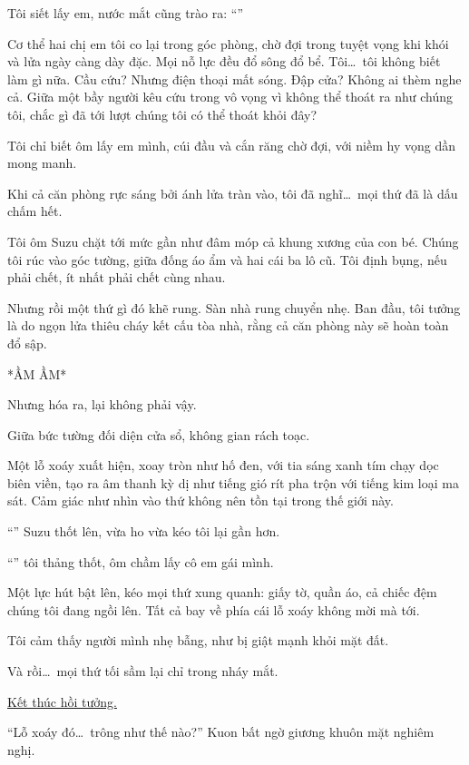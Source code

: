 \documentclass[../main.tex]{subfiles}
\begin{document}
Tôi siết lấy em, nước mắt cũng trào ra: ``''

Cơ thể hai chị em tôi co lại trong góc phòng, chờ đợi trong tuyệt vọng khi khói và lửa ngày càng dày đặc. Mọi nỗ lực đều đổ sông đổ bể. Tôi\dots\ tôi không biết làm gì nữa. Cầu cứu? Nhưng điện thoại mất sóng. Đập cửa? Không ai thèm nghe cả. Giữa một bầy người kêu cứu trong vô vọng vì không thể thoát ra như chúng tôi, chắc gì đã tới lượt chúng tôi có thể thoát khỏi đây?

Tôi chỉ biết ôm lấy em mình, cúi đầu và cắn răng chờ đợi, với niềm hy vọng dần mong manh.

Khi cả căn phòng rực sáng bởi ánh lửa tràn vào, tôi đã nghĩ\dots\ mọi thứ đã là dấu chấm hết.

Tôi ôm Suzu chặt tới mức gần như đâm móp cả khung xương của con bé. Chúng tôi rúc vào góc tường, giữa đống áo ẩm và hai cái ba lô cũ. Tôi định bụng, nếu phải chết, ít nhất phải chết cùng nhau.

Nhưng rồi một thứ gì đó khẽ rung. Sàn nhà rung chuyển nhẹ. Ban đầu, tôi tưởng là do ngọn lửa thiêu cháy kết cấu tòa nhà, rằng cả căn phòng này sẽ hoàn toàn đổ sập.

*ẦM ẦM*

Nhưng hóa ra, lại không phải vậy.

Giữa bức tường đối diện cửa sổ, không gian rách toạc.

Một lỗ xoáy xuất hiện, xoay tròn như hố đen, với tia sáng xanh tím chạy dọc biên viền, tạo ra âm thanh kỳ dị như tiếng gió rít pha trộn với tiếng kim loại ma sát. Cảm giác như nhìn vào thứ không nên tồn tại trong thế giới này.

``'' Suzu thốt lên, vừa ho vừa kéo tôi lại gần hơn.

``'' tôi thảng thốt, ôm chầm lấy cô em gái mình.

Một lực hút bật lên, kéo mọi thứ xung quanh: giấy tờ, quần áo, cả chiếc đệm chúng tôi đang ngồi lên. Tất cả bay về phía cái lỗ xoáy không mời mà tới.

Tôi cảm thấy người mình nhẹ bẫng, như bị giật mạnh khỏi mặt đất.

Và rồi\dots\ mọi thứ tối sầm lại chỉ trong nháy mắt.

\begin{center}
    \uline{Kết thúc hồi tưởng.}
\end{center}

``Lỗ xoáy đó\dots\ trông như thế nào?'' Kuon bất ngờ giương khuôn mặt nghiêm nghị.
\end{document}

